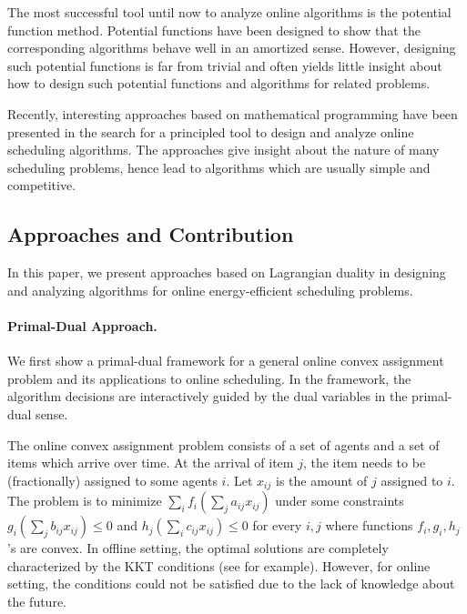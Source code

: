 \documentclass[11pt]{article}
\begin{document}
The most successful tool until now to analyze online algorithms 
is the potential function method. 
Potential functions have been designed to show that the corresponding algorithms behave
well in an amortized sense. However, designing such potential functions is far from trivial and often
yields little insight about how to design such potential functions and algorithms for related problems. 

Recently, interesting approaches 
\cite{AnandGarg12:Resource-augmentation,GuptaKrishnaswamy12:Online-Primal-Dual,Thang13:Lagrangian-Duality} 
based on mathematical programming have been presented 
in the search for a principled tool to design and analyze online scheduling algorithms. 
The approaches give insight about the nature of many scheduling problems,
hence lead to algorithms which are usually simple and competitive.


\subsection{Approaches and Contribution}	
In this paper, we present approaches based on Lagrangian duality in designing and analyzing 
algorithms for online energy-efficient scheduling problems. 

\paragraph{Primal-Dual Approach.} We first show a primal-dual framework for a general online 
convex assignment problem and its applications to online scheduling. In the framework, the algorithm 
decisions are interactively guided by the dual variables in the primal-dual sense. 

The online convex assignment problem consists of a set of agents and a set of items which arrive over time.
At the arrival of item $j$, the item needs to be (fractionally) assigned to some agents $i$. 
Let $x_{ij}$ is the amount of $j$ assigned to $i$.
The problem is to minimize $\sum_{i} f_{i} (\sum_{j} a_{ij}x_{ij} )$  
under some constraints $g_{i} (\sum_{j} b_{ij} x_{ij}) \leq 0$
and $h_{j}(\sum_{i} c_{ij} x_{ij}) \leq 0$ for every $i,j$ where functions $f_{i},g_{i},h_{j}$'s are convex.
In offline setting, the optimal solutions are completely characterized by 
the KKT conditions (see \cite{BoydVandenberghe04:Convex-Optimization} for example).
However, for online setting, the conditions could not be satisfied due to the lack of knowledge
about the future. 
\end{document}
